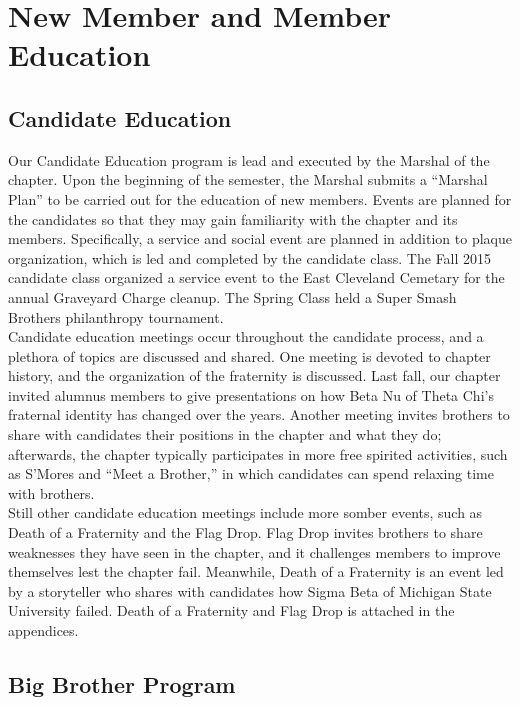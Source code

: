 \chapter{New Member and Member Education}

  \section*{Candidate Education}
    Our Candidate Education program is lead and executed by the Marshal of the chapter. Upon the beginning of the semester, the Marshal submits a ``Marshal Plan'' to be carried out for the education of new members. Events are planned for the candidates so that they may gain familiarity with the chapter and its members. Specifically, a service and social event are planned in addition to plaque organization, which is led and completed by the candidate class. The Fall 2015 candidate class organized a service event to the East Cleveland Cemetary for the annual Graveyard Charge cleanup. The Spring Class held a Super Smash Brothers philanthropy tournament. \\
  
    Candidate education meetings occur throughout the candidate process, and a plethora of topics are discussed and shared. One meeting is devoted to chapter history, and the organization of the fraternity is discussed. Last fall, our chapter invited alumnus members to give presentations on how Beta Nu of Theta Chi's fraternal identity has changed over the years. Another meeting invites brothers to share with candidates their positions in the chapter and what they do; afterwards, the chapter typically participates in more free spirited activities, such as S'Mores and ``Meet a Brother,'' in which candidates can spend relaxing time with brothers. \\

    Still other candidate education meetings include more somber events, such as Death of a Fraternity and the Flag Drop. Flag Drop invites brothers to share weaknesses they have seen in the chapter, and it challenges members to improve themselves lest the chapter fail. Meanwhile, Death of a Fraternity is an event led by a storyteller who shares with candidates how Sigma Beta of Michigan State University failed. Death of a Fraternity and Flag Drop is attached in the appendices.
  
  \section*{Big Brother Program}
  
